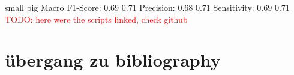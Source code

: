 \documentclass[12pt, a4paper, oneside]{book}   	%
\renewcommand{\todo}[1]{\textcolor{red}{TODO: #1}}
\begin{document}
							small	big
			Macro F1-Score: 0.69	0.71
			Precision: 		0.68	0.71
			Sensitivity:	0.69	0.71
			\todo{here were the scripts linked, check github}
	
			
	\chapter{übergang zu bibliography}

		\newpage
	
	
	\chapter{\bibname}
		\printbibliography[heading=none]
		
		
\end{document}
